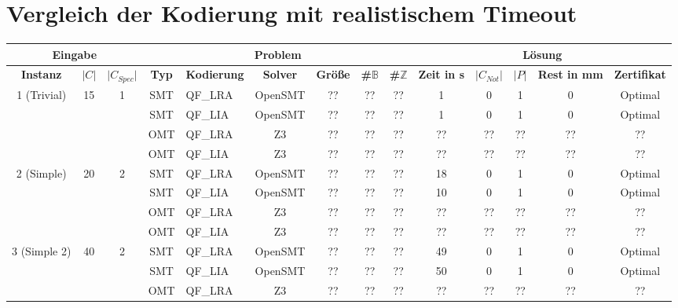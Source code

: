 \section{Vergleich der Kodierung mit realistischem Timeout}
\begin{landscape}
    \begin{table}[H]
        \centering
        \begin{tabular}{|c|c|c|c|l|c|c|c|c|c|c|c|c|c|}
            \hline
            \multicolumn{3}{|c|}{\textbf{Eingabe}} & \multicolumn{6}{|c|}{\textbf{Problem}} & \multicolumn{5}{|c|}{\textbf{Lösung}} \\
            \hline
            \textbf{Instanz} & \textbf{$\lvert C \rvert$} & \textbf{$\lvert C_{Spec} \rvert$} & \textbf{Typ} & \textbf{Kodierung} & \textbf{Solver} & \textbf{Größe} & \textbf{\#$\mathbb{B}$} & \textbf{\#$\mathbb{Z}$} & \textbf{Zeit in s} & \textbf{$\lvert C_{Not} \rvert$} & \textbf{$\lvert P \rvert$} & \textbf{Rest in mm} & \textbf{Zertifikat} \\
            \hline
            \multirow{4}{*}{1 (Trivial)} & \multirow{4}{*}{15} & \multirow{4}{*}{1} & SMT & QF\_LRA & OpenSMT & ?? & ?? & ?? & 1 & 0 & 1 & 0 & Optimal \\
            & & & SMT & QF\_LIA & OpenSMT & ?? & ?? & ?? & 1 & 0 & 1 & 0 & Optimal \\
            & & & OMT & QF\_LRA & Z3 & ?? & ?? & ?? & ?? & ?? & ?? & ?? & ?? \\
            & & & OMT & QF\_LIA & Z3 & ?? & ?? & ?? & ?? & ?? & ?? & ?? & ?? \\
            \hline
            \multirow{4}{*}{2 (Simple)} & \multirow{4}{*}{20} & \multirow{4}{*}{2} & SMT & QF\_LRA & OpenSMT & ?? & ?? & ?? & 18 & 0 & 1 & 0 & Optimal \\
            & & & SMT & QF\_LIA & OpenSMT & ?? & ?? & ?? & 10 & 0 & 1 & 0 & Optimal \\
            & & & OMT & QF\_LRA & Z3 & ?? & ?? & ?? & ?? & ?? & ?? & ?? & ?? \\
            & & & OMT & QF\_LIA & Z3 & ?? & ?? & ?? & ?? & ?? & ?? & ?? & ?? \\
            \hline
            \multirow{4}{*}{3 (Simple 2)} & \multirow{4}{*}{40} & \multirow{4}{*}{2} & SMT & QF\_LRA & OpenSMT & ?? & ?? & ?? & 49 & 0 & 1 & 0 & Optimal \\
            & & & SMT & QF\_LIA & OpenSMT & ?? & ?? & ?? & 50 & 0 & 1 & 0 & Optimal \\
            & & & OMT & QF\_LRA & Z3 & ?? & ?? & ?? & ?? & ?? & ?? & ?? & ?? \\

\end{tabular}
\end{table}
\end{landscape}

